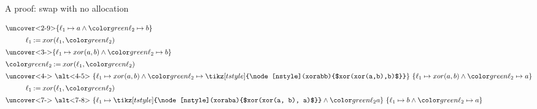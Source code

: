 \begin{frame}{A proof: swap with no allocation}


\begin{gather*}
\intertext{\uncover<2-9>{$\lbrace \addra \mapsto a \wedge \addrb \mapsto b \rbrace$}}
    \addra \mathbin{:=} xor(\addra, \addrb)\\
\intertext{\uncover<3->{$\lbrace \addra \mapsto xor(a, b) \wedge \addrb \mapsto b \rbrace$}}
\addrb \mathbin{:=} xor(\addra, \addrb)\\
\intertext{\uncover<4->{
   \alt<4-5>
   {$\lbrace \addra \mapsto xor(a, b)
        \wedge \addrb \mapsto \tikz[tstyle]{\node[nstyle](xorabb){$xor(xor(a,b),b)$}} \rbrace$}
   {$\lbrace \addra \mapsto xor(a, b) \wedge \addrb \mapsto a \rbrace$}}}
\addra \mathbin{:=} xor(\addra, \addrb)\\
\intertext{\uncover<7->{
   \alt<7-8>
   {$\lbrace \addra \mapsto \tikz[tstyle]{\node[nstyle](xoraba){$xor(xor(a, b), a)$}}
        \wedge \addrb a \rbrace$}
   {$\lbrace \addra \mapsto b \wedge \addrb \mapsto a \rbrace$}}}
\end{gather*}


\end{frame}
